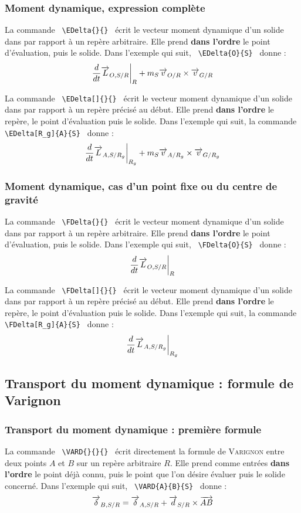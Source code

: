\documentclass[12pt]{article}
\begin{document}
\subsubsection{Moment dynamique, expression complète}
La commande \verb| \EDelta{}{} | écrit le vecteur moment dynamique d'un solide dans par rapport à un repère arbitraire. Elle prend \textbf{dans l'ordre} le point d'évaluation, puis le solide. Dans l'exemple qui suit, \verb| \EDelta{O}{S} | donne : $$\EDelta{O}{S}$$

La commande \verb| \EDelta[]{}{} | écrit le vecteur moment dynamique d'un solide dans par rapport à un repère précisé au début. Elle prend \textbf{dans l'ordre} le repère, le point d'évaluation puis le solide. Dans l'exemple qui suit, la commande \verb| \EDelta[R_g]{A}{S} | donne : $$\EDelta[R_g]{A}{S}$$

\subsubsection{Moment dynamique, cas d'un point fixe ou du centre de gravité}
La commande \verb| \FDelta{}{} | écrit le vecteur moment dynamique d'un solide dans par rapport à un repère arbitraire. Elle prend \textbf{dans l'ordre} le point d'évaluation, puis le solide. Dans l'exemple qui suit, \verb| \FDelta{O}{S} | donne : $$\FDelta{O}{S}$$

La commande \verb| \FDelta[]{}{} | écrit le vecteur moment dynamique d'un solide dans par rapport à un repère précisé au début. Elle prend \textbf{dans l'ordre} le repère, le point d'évaluation puis le solide. Dans l'exemple qui suit, la commande \verb| \FDelta[R_g]{A}{S} | donne : $$\FDelta[R_g]{A}{S}$$

\subsection{Transport du moment dynamique : formule de Varignon}

\subsubsection{Transport du moment dynamique : première formule}
La commande \verb| \VARD{}{}{} | écrit directement la formule de \textsc{Varignon} entre deux points $A$ et $B$ sur un repère arbitraire $R$. Elle prend comme entrées \textbf{dans l'ordre} le point déjà connu, puis le point que l'on désire évaluer puis le solide concerné. Dans l'exemple qui suit, \verb| \VARD{A}{B}{S} | donne : $$\VARD{A}{B}{S}$$
\end{document}
